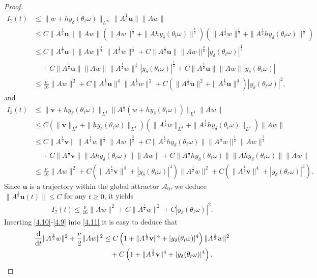 \documentclass{elsarticle}
\theoremstyle{definition}
\numberwithin{equation}{section}
\renewcommand{\d}{{\rm{d}}}
\begin{document}
\begin{proof}
\begin{align}
I_{2}(t)&\leq \|w+hy_\delta(\theta_t\omega)\|_{L^\infty}\|A^{\frac12}\textbf{u}\|\|Aw\|\nonumber\\
&\leq C\|A^{\frac12}\textbf{u}\|\|Aw\| \left(\|Aw\|^{\frac12}+\|Ahy_\delta(\theta_t\omega)\|^{\frac12} \right) \left
(\|A^{\frac12}w\|^{\frac12}+\|A^{\frac12}hy_\delta(\theta_t\omega)\|^{\frac12} \right )\nonumber\\
&\leq C\|A^{\frac12}\textbf{u}\|\|Aw\|^{\frac32}\|A^{\frac12}w\|^{\frac12}
+C\|A^{\frac12}\textbf{u}\|\|Aw\|^{\frac32}|y_\delta(\theta_t\omega)|^{\frac12}\nonumber\\
&\quad +C\|A^{\frac12}\textbf{u}\|\|Aw\|\|A^{\frac12}w\|^{\frac12}|y_\delta(\theta_t\omega)|^{\frac12}+
C\|A^{\frac12}\textbf{u}\|\|Aw\||y_\delta(\theta_t\omega)|\nonumber\\
&\leq \frac{\nu}{16}\|Aw\|^2+C\|A^{\frac12}\textbf{u}\|^4\|A^{\frac12}w\|^2
+C \left (\|A^{\frac12}\textbf{u}\|^2+\|A^{\frac12}\textbf{u}\|^4 \right) |y_\delta(\theta_t\omega)|^2,
\end{align}
and
\begin{align}
I_{3}(t)&\leq \|\textbf{v}+hy_\delta(\theta_t\omega)\|_{L^4}\|A^{\frac12}(w+hy_\delta(\theta_t\omega))\|_{L^4}\|Aw\|\nonumber\\
&\leq C \left (\|\textbf{v}\|_{L^4}+\|hy_\delta(\theta_t\omega)\|_{L^4} \right ) \left(\|A^{\frac12}w\|_{L^4}+\|A^{\frac12}hy_\delta(\theta_t\omega)\|_{L^4} \right)\|Aw\|\nonumber\\
&\leq C\|A^{\frac12}\textbf{v}\|\|A^{\frac12}w\|^{\frac12}\|Aw\|^{\frac32}
+C\|A^{\frac12}hy_\delta(\theta_t\omega)\|\|A^{\frac12}w\|^{\frac12}\|Aw\|^{\frac32}\nonumber\\
&\quad +C\|A^{\frac12}\textbf{v}\|\|Ahy_\delta(\theta_t\omega)\|\|Aw\|+C\|A^{\frac12}hy_\delta(\theta_t\omega)\|
\|Ahy_\delta(\theta_t\omega)\|\|Aw\|
\nonumber\\
&\leq \frac{\nu}{16}\|Aw\|^2+C \! \left (\|A^{\frac12}\textbf{v}\|^4+|y_\delta(\theta_t\omega)|^4 \right )\|A^{\frac12}w\|^2
+C \! \left (\|A^{\frac12}\textbf{v}\|^4+|y_\delta(\theta_t\omega)|^4 \right).
\nonumber
\end{align}
 Since $\textbf{u}$ is a trajectory within the global attractor $\mathcal{A}_0$, we deduce $\|A^{\frac12}\textbf{u}(t)\|\leq C$ for any $t\geq0$, it yields
\begin{align}\label{4.9}
I_{2}(t)
\leq \frac{\nu}{16}\|Aw\|^2+C\|A^{\frac12}w\|^2+C|y_\delta(\theta_t\omega)|^2.
\end{align}
Inserting \eqref{4.10}-\eqref{4.9} into \eqref{4.11} it is easy to deduce that
\begin{align}
\frac{\d}{\d t}\|A^{\frac12}w\|^2+  \frac{\nu}{2} \|Aw\|^2
&\leq C \left (1+\|A^{\frac12}\textbf{v}\|^4+|y_\delta(\theta_t\omega)|^4 \right )\|A^{\frac12}w\|^2  \nonumber \\
&\quad
+C \left(1+\|A^{\frac12}\textbf{v}\|^4+|y_\delta(\theta_t\omega)|^4\right) .
\label{sep6.1}
\end{align}


\end{proof}
\end{document}

